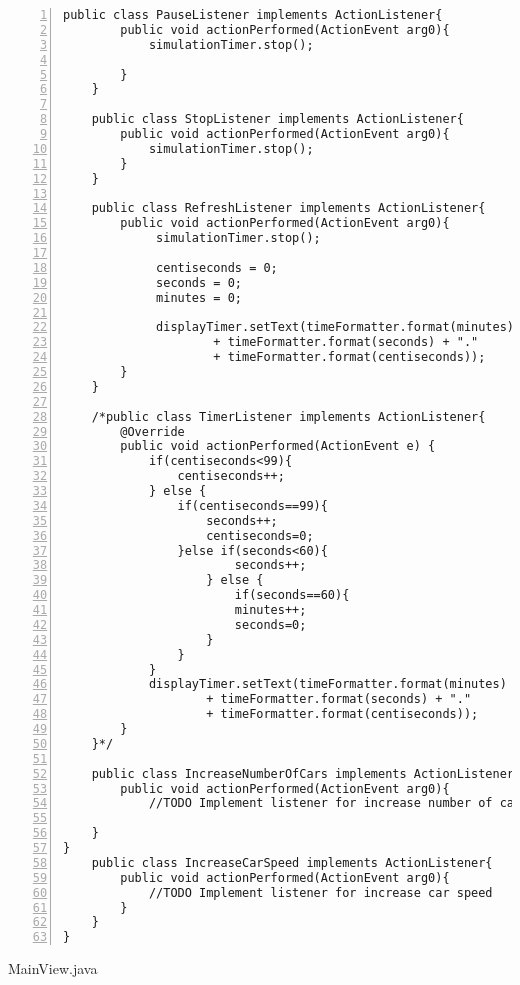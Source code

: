 \begin{lstlisting}[numbers=left, numberstyle=\small, numbersep=8pt,  framexleftmargin=1pt, framexrightmargin=10pt ]
	public class PauseListener implements ActionListener{
		public void actionPerformed(ActionEvent arg0){
			simulationTimer.stop();
			
		}
	}
	
	public class StopListener implements ActionListener{
		public void actionPerformed(ActionEvent arg0){
			simulationTimer.stop();
		}
	}
	
	public class RefreshListener implements ActionListener{
		public void actionPerformed(ActionEvent arg0){
			 simulationTimer.stop();

             centiseconds = 0;
             seconds = 0;
             minutes = 0;

             displayTimer.setText(timeFormatter.format(minutes) + ":"
                     + timeFormatter.format(seconds) + "."
                     + timeFormatter.format(centiseconds));
		}
	}
	
	/*public class TimerListener implements ActionListener{
        @Override
        public void actionPerformed(ActionEvent e) {
        	if(centiseconds<99){	
        		centiseconds++;
        	} else {
        		if(centiseconds==99){
        			seconds++;
        			centiseconds=0; 
        		}else if(seconds<60){
        				seconds++;
        			} else {
        				if(seconds==60){
        				minutes++;
        				seconds=0;
        			}
        		}
        	}
        	displayTimer.setText(timeFormatter.format(minutes) + ":"
                    + timeFormatter.format(seconds) + "."
                    + timeFormatter.format(centiseconds));
        }
    }*/
	
	public class IncreaseNumberOfCars implements ActionListener{
		public void actionPerformed(ActionEvent arg0){
			//TODO Implement listener for increase number of cars
		
	}
}
	public class IncreaseCarSpeed implements ActionListener{
		public void actionPerformed(ActionEvent arg0){
			//TODO Implement listener for increase car speed 
		}
	}
}
\end{lstlisting}


MainView.java

